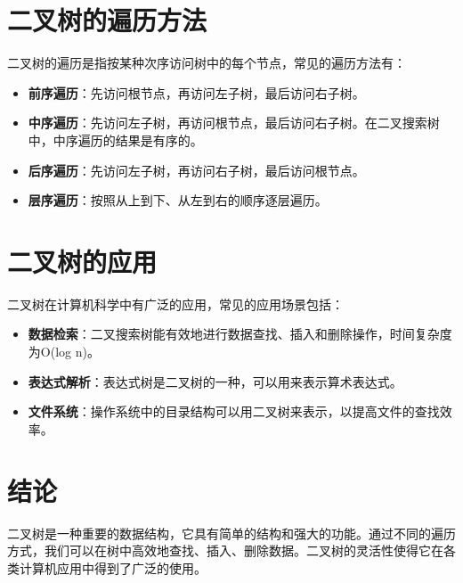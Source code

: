 \documentclass[a4paper,12pt]{report}
\begin{document}
\section{二叉树的遍历方法}

二叉树的遍历是指按某种次序访问树中的每个节点，常见的遍历方法有：
\begin{itemize}
    \item \textbf{前序遍历}：先访问根节点，再访问左子树，最后访问右子树。
    \item \textbf{中序遍历}：先访问左子树，再访问根节点，最后访问右子树。在二叉搜索树中，中序遍历的结果是有序的。
    \item \textbf{后序遍历}：先访问左子树，再访问右子树，最后访问根节点。
    \item \textbf{层序遍历}：按照从上到下、从左到右的顺序逐层遍历。
\end{itemize}

\section{二叉树的应用}

二叉树在计算机科学中有广泛的应用，常见的应用场景包括：
\begin{itemize}
    \item \textbf{数据检索}：二叉搜索树能有效地进行数据查找、插入和删除操作，时间复杂度为O(log n)。
    \item \textbf{表达式解析}：表达式树是二叉树的一种，可以用来表示算术表达式。
    \item \textbf{文件系统}：操作系统中的目录结构可以用二叉树来表示，以提高文件的查找效率。
\end{itemize}

\section{结论}

二叉树是一种重要的数据结构，它具有简单的结构和强大的功能。通过不同的遍历方式，我们可以在树中高效地查找、插入、删除数据。二叉树的灵活性使得它在各类计算机应用中得到了广泛的使用。
\end{document}
